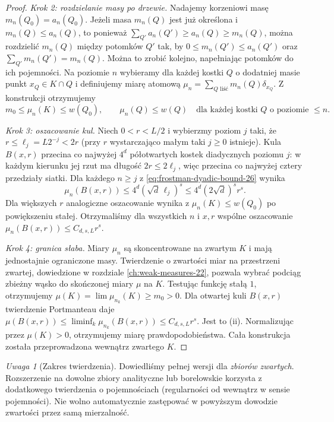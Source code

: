 \documentclass[11pt,a4paper,oneside]{book}
\numberwithin{equation}{chapter}
\theoremstyle{plain}
\theoremstyle{definition}
\theoremstyle{remark}
\newtheorem{uwaga}[twierdzenie]{Uwaga}
\begin{document}
\begin{proof}
\emph{Krok 2: rozdzielanie masy po drzewie.} Nadajemy
korzeniowi masę $m_n(Q_0)=a_n(Q_0)$.
Jeżeli masa $m_n(Q)$ jest już określona i
$m_n(Q)\le a_n(Q)$, to ponieważ
$\sum_{Q'}a_n(Q')\ge a_n(Q)\ge m_n(Q)$,
można rozdzielić $m_n(Q)$ między potomków $Q'$
tak, by $0\le m_n(Q')\le a_n(Q')$ oraz
$\sum_{Q'}m_n(Q')=m_n(Q)$. Można to zrobić
kolejno, napełniając potomków do ich pojemności.
Na poziomie $n$ wybieramy dla każdej kostki
$Q$ o dodatniej masie punkt $x_Q\in K\cap Q$
i definiujemy miarę atomową
$\mu_n=\sum_{Q\text{ liść}}m_n(Q)\delta_{x_Q}$.
Z konstrukcji otrzymujemy
\begin{equation}\label{eq:frostman-dyadic-bound-26}
 m_0\le\mu_n(K)\le w(Q_0),\qquad
 \mu_n(Q)\le w(Q)
 \quad\text{dla każdej kostki }Q\text{ o poziomie }\le n.
\end{equation}

\emph{Krok 3: oszacowanie kul.} Niech $0<r<L/2$
i wybierzmy poziom $j$ taki, że
$r\le\ell_j=L2^{-j}<2r$ (przy $r$ wystarczająco
małym taki $j\ge0$ istnieje). Kula $B(x,r)$
przecina co najwyżej $4^d$ półotwartych kostek
diadycznych poziomu $j$: w każdym kierunku jej
rzut ma długość $2r\le2\ell_j$, więc przecina
co najwyżej cztery przedziały siatki.
Dla każdego $n\ge j$ z
\eqref{eq:frostman-dyadic-bound-26} wynika
\[
 \mu_n(B(x,r))\le4^d(\sqrt d\,\ell_j)^s
 \le4^d(2\sqrt d)^s r^s.
\]
Dla większych $r$ analogiczne oszacowanie wynika z
$\mu_n(K)\le w(Q_0)$ po powiększeniu stałej.
Otrzymaliśmy dla wszystkich $n$ i $x,r$ wspólne
oszacowanie $\mu_n(B(x,r))\le C_{d,s,L}r^s$.

\emph{Krok 4: granica słaba.} Miary $\mu_n$ są
skoncentrowane na zwartym $K$ i mają jednostajnie
ograniczone masy. Twierdzenie o zwartości miar na
przestrzeni zwartej, dowiedzione w rozdziale
\ref{ch:weak-measures-22}, pozwala wybrać podciąg
zbieżny wąsko do skończonej miary $\mu$ na $K$.
Testując funkcję stałą $1$, otrzymujemy
$\mu(K)=\lim\mu_{n_k}(K)\ge m_0>0$.
Dla otwartej kuli $B(x,r)$ twierdzenie Portmanteau
daje
$\mu(B(x,r))\le\liminf_k\mu_{n_k}(B(x,r))
\le C_{d,s,L}r^s$. Jest to (ii).
Normalizując przez $\mu(K)>0$, otrzymujemy miarę
prawdopodobieństwa. Cała konstrukcja została
przeprowadzona wewnątrz zwartego $K$.
\end{proof}

\begin{uwaga}[Zakres twierdzenia]
Dowiedliśmy pełnej wersji dla \emph{zbiorów zwartych}.
Rozszerzenie na dowolne zbiory analityczne lub borelowskie
korzysta z dodatkowego twierdzenia o pojemnościach
(regularności od wewnątrz w sensie pojemności).
Nie wolno automatycznie zastępować w powyższym dowodzie
zwartości przez samą mierzalność.
\end{uwaga}
\end{document}
